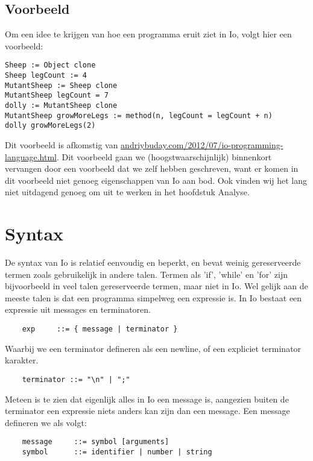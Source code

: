 \documentclass[12pt]{article}
\begin{document}
\subsection*{Voorbeeld}
Om een idee te krijgen van hoe een programma eruit ziet in Io, volgt hier een voorbeeld:
\begin{lstlisting}[frame=single]
Sheep := Object clone
Sheep legCount := 4
MutantSheep := Sheep clone
MutantSheep legCount = 7
dolly := MutantSheep clone
MutantSheep growMoreLegs := method(n, legCount = legCount + n)
dolly growMoreLegs(2)
\end{lstlisting}
Dit voorbeeld is afkomstig van \url{andriybuday.com/2012/07/io-programming-language.html}.
Dit voorbeeld gaan we (hoogstwaarschijnlijk) binnenkort vervangen door een voorbeeld dat we zelf hebben geschreven, want er komen in dit voorbeeld niet genoeg
eigenschappen van Io aan bod. Ook vinden wij het lang niet uitdagend genoeg om uit te werken in het hoofdstuk Analyse.

\section{Syntax}

De syntax van Io is relatief eenvoudig en beperkt, en bevat weinig gereserveerde termen zoals gebruikelijk in andere talen. Termen als 'if', 'while' en 'for' zijn bijvoorbeeld in veel talen gereserveerde termen, maar niet in Io. Wel gelijk aan de meeste talen is dat een programma simpelweg een expressie is. In Io bestaat een expressie uit messages en terminatoren.

\begin{lstlisting}
	exp		::= { message | terminator }
\end{lstlisting}
Waarbij we een terminator defineren als een newline, of een expliciet terminator karakter.
\begin{lstlisting}
	terminator ::= "\n" | ";"
\end{lstlisting}
Meteen is te zien dat eigenlijk alles in Io een message is, aangezien buiten de terminator een expressie niets anders kan zijn dan een message. Een message defineren we als volgt:
\begin{lstlisting}
	message		::= symbol [arguments]
	symbol		::= identifier | number | string
\end{lstlisting}
\end{document}
